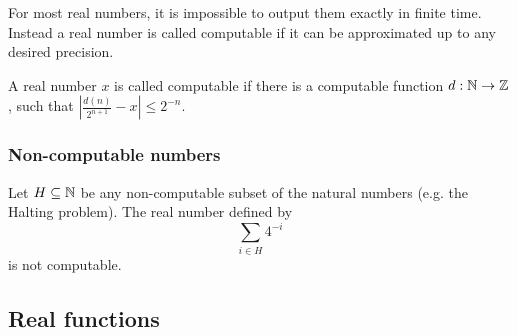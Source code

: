 \begin{frame}
  For most real numbers, it is impossible to output them exactly in finite time.
  Instead a real number is called computable if it can be approximated up to any desired precision.
  \vfill
  \pause
\begin{minipage}{.45\textwidth}
		\begin{figure}
		\centering
    \vfill
		\end{figure}
	\end{minipage}
	\hfill
	\begin{minipage}{.45\textwidth}
	\begin{definition}
		A real number $x$ is called computable if there is a computable function $d:\mathbb{N}\to\mathbb{Z}$, such that $ \left|\frac{d(n)}{2^{n+1}} - x\right|\leq 2^{-n}$.   
	\end{definition}
	\end{minipage}
\end{frame}
\begin{frame}
  \frametitle{Non-computable numbers}
  \begin{example}[Specker]
    Let $H \subseteq \mathbb{N}$ be any non-computable subset of the natural numbers (e.g. the Halting problem).
    \pause
    The real number defined by 
    $$
      \sum_{i \in H} 4^{-i}
    $$
    is not computable.
  \end{example}
\end{frame}
\subsection{Real functions}

